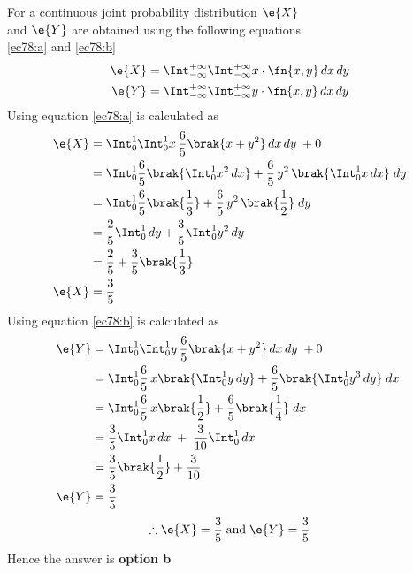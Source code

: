 For a continuous joint probability distribution  $\e{X}$ \\
and $\e{Y}$ are obtained using the following equations  \\
\eqref{ec78:a} and \eqref{ec78:b}
\begin{align}
\e{X} &= \Int_{-\infty}^{+\infty}\Int_{-\infty}^{+\infty} x \cdot \fn{x,y}\,dx\,dy \label{ec78:a} \\ 
\e{Y} &= \Int_{-\infty}^{+\infty}\Int_{-\infty}^{+\infty} y \cdot \fn{x,y}\,dx\,dy \label{ec78:b}
\end{align}
Using equation \eqref{ec78:a}  is calculated as 
\newpage
\begin{align*}
\e{X} &= \Int_{0}^{1}\Int_{0}^{1} x\,\dfrac{6}{5}\brak{x+y^2}\,dx\,dy \;+ 0 \\ 
      &= \Int_{0}^{1}\dfrac{6}{5}\brak{\Int_{0}^{1}x^2\,dx}+\dfrac{6}{5}\,y^2\,\brak{\Int_{0}^{1}x\,dx}\;dy   \\
      &= \Int_{0}^{1}\dfrac{6}{5}\brak{\dfrac{1}{3}}+\dfrac{6}{5}\,y^2\,\brak{\dfrac{1}{2}}\;dy \\
      &= \dfrac{2}{5}\Int_{0}^{1}\,dy + \dfrac{3}{5}\Int_{0}^{1}y^2\,dy  \\
      &= \dfrac{2}{5} + \dfrac{3}{5}\brak{\dfrac{1}{3}} \\
\e{X} &=  \dfrac{3}{5}  
\end{align*}
Using equation \eqref{ec78:b}  is calculated as
\begin{align*}
\e{Y} &= \Int_{0}^{1}\Int_{0}^{1} y\,\dfrac{6}{5}\brak{x+y^2}\,dx\,dy \;+ 0 \\ 
      &= \Int_{0}^{1}\dfrac{6}{5}\,x\brak{\Int_{0}^{1}y\,dy} + \dfrac{6}{5}\brak{\Int_{0}^{1}y^{3}\,dy}\;dx \; \\ 
      &= \Int_{0}^{1}\dfrac{6}{5}\,x\brak{\dfrac{1}{2}} + \dfrac{6}{5}\brak{\dfrac{1}{4}}\;dx \; \\ 
      &= \dfrac{3}{5}\Int_{0}^{1}x\,dx\;+\;\dfrac{3}{10}\Int_{0}^{1}\,dx  \\
      &= \dfrac{3}{5} \brak{\dfrac{1}{2}} + \dfrac{3}{10} \\
\e{Y} &= \dfrac{3}{5}      
\end{align*}
 $$\therefore \e{X} = \dfrac{3}{5}\;\text{and}\;\e{Y} = \dfrac{3}{5}$$ 
 Hence the answer is \textbf{option b}
